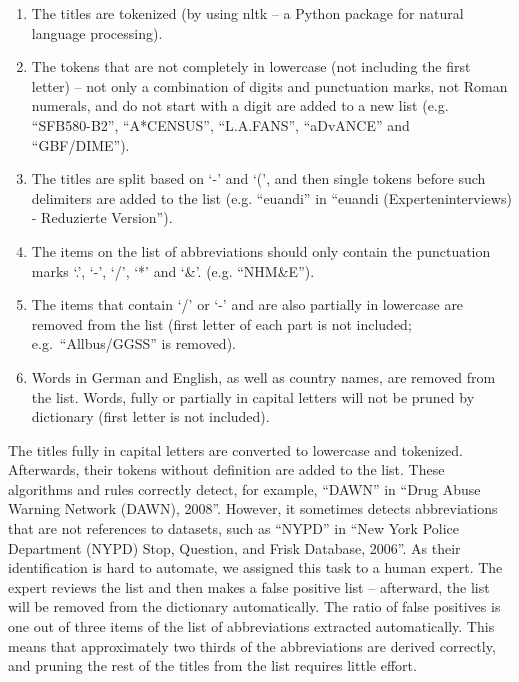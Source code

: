 \documentclass{IOS-Book-Article}
\begin{document}
\begin{enumerate}
	\item The titles are tokenized (by using nltk -- a Python package for natural language processing).
	\item The tokens that are not completely in lowercase (not including the first letter) -- not only a combination of digits and punctuation marks, not Roman numerals, and do not start with a digit are added to a new list (e.g. \enquote{SFB580-B2}, \enquote{A*CENSUS}, \enquote{L.A.FANS}, \enquote{aDvANCE}
	and \enquote{GBF/DIME}).
	\item The titles are split based on `-' and `(', and then single tokens before such delimiters are added to the list (e.g. \enquote{euandi} in \enquote{euandi (Experteninterviews) - Reduzierte Version}).
	\item The items on the list of abbreviations should only contain the punctuation marks `.', `-', `/', `*' and `\&'. (e.g. \enquote{NHM\&E}).
	\item The items that contain `/' or `-' and are also partially in lowercase are removed from the list (first letter of each part is not included; e.g.\ \enquote{Allbus/GGSS} is removed). 
	\item Words in German and English, as well as country names, are removed from the list. Words, fully or partially in capital letters will not be pruned by dictionary (first letter is not included).
\end{enumerate}
The titles fully in capital letters are converted to lowercase and tokenized.
Afterwards, %
their tokens without definition are added to the list.
These algorithms and rules correctly detect, for example, \enquote{DAWN} in \enquote{Drug Abuse Warning Network (DAWN), 2008}.
However, it sometimes detects abbreviations that are not references to datasets, such as \enquote{NYPD} in \enquote{New York Police Department (NYPD) Stop, Question, and Frisk Database, 2006}.
As their identification is hard to automate, we assigned this task to a human expert. 
The expert reviews the list and then makes a false positive list -- afterward, the list will be removed from the dictionary automatically. The ratio of false positives is one out of three items of the list of abbreviations extracted automatically.
This means that approximately two thirds of the abbreviations are derived correctly, and pruning the rest of the titles from the list requires little effort.
\end{document}
